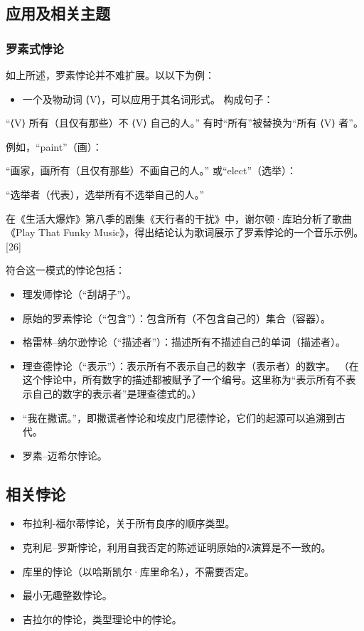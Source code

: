 \subsection{应用及相关主题}  
\subsubsection{罗素式悖论}  
如上所述，罗素悖论并不难扩展。以以下为例：
\begin{itemize}
\item 一个及物动词 ⟨V⟩，可以应用于其名词形式。  
构成句子：
\end{itemize}
“⟨V⟩ 所有（且仅有那些）不 ⟨V⟩ 自己的人。”  
有时“所有”被替换为“所有 ⟨V⟩ 者”。

例如，“paint”（画）：

“画家，画所有（且仅有那些）不画自己的人。”  
或“elect”（选举）：

“选举者（代表），选举所有不选举自己的人。”

在《生活大爆炸》第八季的剧集《天行者的干扰》中，谢尔顿·库珀分析了歌曲《Play That Funky Music》，得出结论认为歌词展示了罗素悖论的一个音乐示例。[26]

符合这一模式的悖论包括：
\begin{itemize}
\item 理发师悖论（“刮胡子”）。
\item 原始的罗素悖论（“包含”）：包含所有（不包含自己的）集合（容器）。
\item 格雷林–纳尔逊悖论（“描述者”）：描述所有不描述自己的单词（描述者）。
\item 理查德悖论（“表示”）：表示所有不表示自己的数字（表示者）的数字。
  （在这个悖论中，所有数字的描述都被赋予了一个编号。这里称为“表示所有不表示自己的数字的表示者”是理查德式的。）
\item “我在撒谎。”，即撒谎者悖论和埃皮门尼德悖论，它们的起源可以追溯到古代。
\item 罗素–迈希尔悖论。
\end{itemize}
\subsection{相关悖论}
\begin{itemize}
\item 布拉利-福尔蒂悖论，关于所有良序的顺序类型。
\item 克利尼–罗斯悖论，利用自我否定的陈述证明原始的λ演算是不一致的。
\item 库里的悖论（以哈斯凯尔·库里命名），不需要否定。
\item 最小无趣整数悖论。
\item 吉拉尔的悖论，类型理论中的悖论。
\end{itemize}
